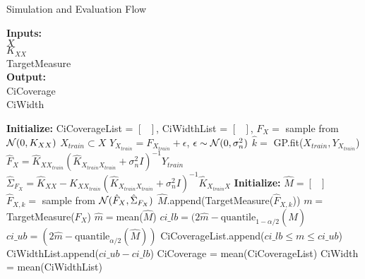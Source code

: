 \begin{algorithm}[h!] \caption{Simulation and Evaluation Flow}
 \hspace*{\algorithmicindent} \textbf{Inputs:} \\
 \hspace*{\algorithmicindent} $X$  \\
 \hspace*{\algorithmicindent} $K_{XX}$ \\
 \hspace*{\algorithmicindent} TargetMeasure  \\
 \hspace*{\algorithmicindent} \textbf{Output:} \\
 \hspace*{\algorithmicindent} CiCoverage \\
 \hspace*{\algorithmicindent} CiWidth \\
\begin{algorithmic}[1]
    \State \textbf{Initialize:} CiCoverageList = $\left[ \text{ } \right]$, CiWidthList = $\left[ \text{ } \right]$,
        \State $F_X =$ sample from $\operatorname{\mathcal{N}}(0, K_{XX})$ 
        \State $X_{train} \subset X$ 
        \State $Y_{X_{train}} = F_{X_{train}} + \epsilon$, $\epsilon \sim  \operatorname{\mathcal{N}}(0, \sigma_n^2)$
        \State $\hat{k}=$ GP.fit($X_{train}, Y_{X_{train}}$) 
        \State $\hat{F}_X = \hat{K}_{XX_{train}} (\hat{K}_{X_{train}X_{train}} + \sigma_n^2 I)^{-1} Y_{train}$ 
        \State $\hat{\Sigma}_{F_X} = \hat{K}_{XX} -\hat{K}_{XX_{train}}(\hat{K}_{X_{train}X_{train}} + \sigma_n^2 I)^{-1}\hat{K}_{X_{train}X}$ 
        \State \textbf{Initialize:} $\hat{M} = \left[ \text{ } \right]$
            \State $\hat{F}_{X,k} = $ sample from $\operatorname{\mathcal{N}}(\hat{F}_X, \hat{\Sigma}_{F_X} )$ 
            \State $\hat{M}$.append(TargetMeasure($\hat{F}_{X, k}$)) 
        \EndFor
    \State $m =$ TargetMeasure($F_X$) 
    \State $\hat{m} = $mean($\hat{M}$)
    \State $ci\_lb = (2\hat{m} - \text{quantile}_{1-\alpha/2}(\hat{M})$ 
    \State $ci\_ub = (2\hat{m} - \text{quantile}_{\alpha/2}(\hat{M}))$ 
    \State CiCoverageList.append($ ci\_lb \leq m \leq ci\_ub$)
    \State CiWidthList.append($ci\_ub - ci\_lb $)
    \EndFor
    \State CiCoverage = mean(CiCoverageList)
    \State CiWidth = mean(CiWidthList)
\end{algorithmic}
\end{algorithm}\label{pc:simulation-evaluation-flow}

